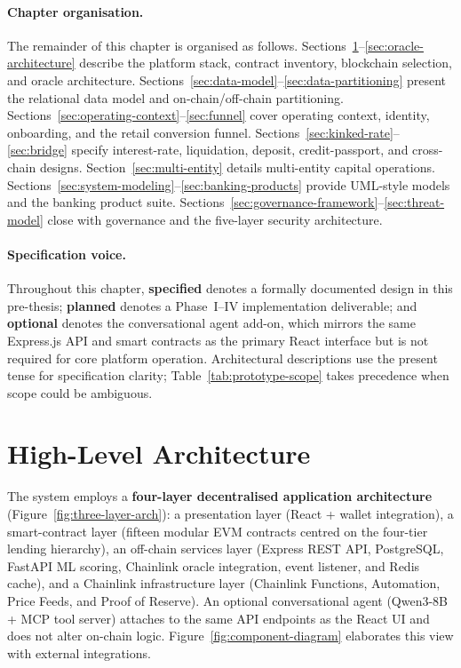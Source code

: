 \documentclass[12pt,a4paper]{report}
\begin{document}
\paragraph{Chapter organisation.}
The remainder of this chapter is organised as follows. Sections~\ref{sec:high-level-arch}--\ref{sec:oracle-architecture} describe the platform stack, contract inventory, blockchain selection, and oracle architecture. Sections~\ref{sec:data-model}--\ref{sec:data-partitioning} present the relational data model and on-chain/off-chain partitioning. Sections~\ref{sec:operating-context}--\ref{sec:funnel} cover operating context, identity, onboarding, and the retail conversion funnel. Sections~\ref{sec:kinked-rate}--\ref{sec:bridge} specify interest-rate, liquidation, deposit, credit-passport, and cross-chain designs. Section~\ref{sec:multi-entity} details multi-entity capital operations. Sections~\ref{sec:system-modeling}--\ref{sec:banking-products} provide UML-style models and the banking product suite. Sections~\ref{sec:governance-framework}--\ref{sec:threat-model} close with governance and the five-layer security architecture.

\paragraph{Specification voice.}
Throughout this chapter, \textbf{specified} denotes a formally documented design in this pre-thesis; \textbf{planned} denotes a Phase~I--IV implementation deliverable; and \textbf{optional} denotes the conversational agent add-on, which mirrors the same Express.js API and smart contracts as the primary React interface but is not required for core platform operation. Architectural descriptions use the present tense for specification clarity; Table~\ref{tab:prototype-scope} takes precedence when scope could be ambiguous.

\section{High-Level Architecture}
\label{sec:high-level-arch}

The system employs a \textbf{four-layer decentralised application architecture} (Figure~\ref{fig:three-layer-arch}): a presentation layer (React + wallet integration), a smart-contract layer (fifteen modular EVM contracts centred on the four-tier lending hierarchy), an off-chain services layer (Express REST API, PostgreSQL, FastAPI ML scoring, Chainlink oracle integration, event listener, and Redis cache), and a Chainlink infrastructure layer (Chainlink Functions, Automation, Price Feeds, and Proof of Reserve). An optional conversational agent (Qwen3-8B + MCP tool server) attaches to the same API endpoints as the React UI and does not alter on-chain logic. Figure~\ref{fig:component-diagram} elaborates this view with external integrations.
\end{document}
